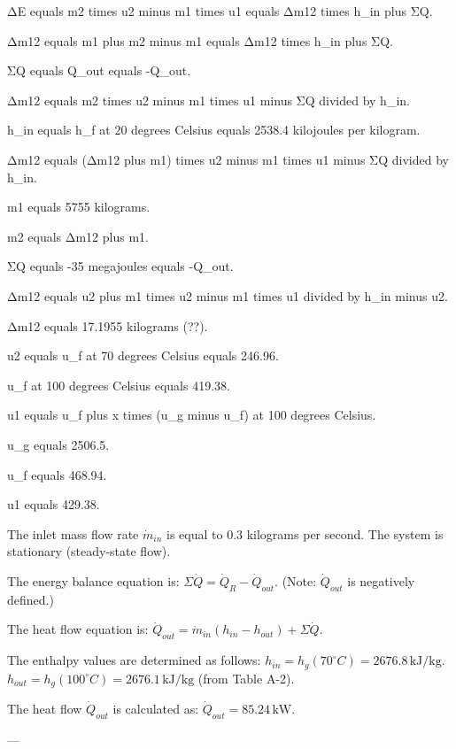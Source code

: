 ΔE equals m2 times u2 minus m1 times u1 equals Δm12 times h_in plus ΣQ.  

Δm12 equals m1 plus m2 minus m1 equals Δm12 times h_in plus ΣQ.  

ΣQ equals Q_out equals -Q_out.  

Δm12 equals m2 times u2 minus m1 times u1 minus ΣQ divided by h_in.  

h_in equals h_f at 20 degrees Celsius equals 2538.4 kilojoules per kilogram.  

Δm12 equals (Δm12 plus m1) times u2 minus m1 times u1 minus ΣQ divided by h_in.  

m1 equals 5755 kilograms.  

m2 equals Δm12 plus m1.  

ΣQ equals -35 megajoules equals -Q_out.  

Δm12 equals u2 plus m1 times u2 minus m1 times u1 divided by h_in minus u2.  

Δm12 equals 17.1955 kilograms (??).  

u2 equals u_f at 70 degrees Celsius equals 246.96.  

u_f at 100 degrees Celsius equals 419.38.  

u1 equals u_f plus x times (u_g minus u_f) at 100 degrees Celsius.  

u_g equals 2506.5.  

u_f equals 468.94.  

u1 equals 429.38.

The inlet mass flow rate \( \dot{m}_{in} \) is equal to 0.3 kilograms per second.  
The system is stationary (steady-state flow).  

The energy balance equation is:  
\( \Sigma \dot{Q} = \dot{Q}_R - \dot{Q}_{out} \).  
(Note: \( \dot{Q}_{out} \) is negatively defined.)  

The heat flow equation is:  
\( \dot{Q}_{out} = \dot{m}_{in} (h_{in} - h_{out}) + \Sigma \dot{Q} \).  

The enthalpy values are determined as follows:  
\( h_{in} = h_g(70^\circ C) = 2676.8 \, \text{kJ/kg} \).  
\( h_{out} = h_g(100^\circ C) = 2676.1 \, \text{kJ/kg} \) (from Table A-2).  

The heat flow \( \dot{Q}_{out} \) is calculated as:  
\( \dot{Q}_{out} = 85.24 \, \text{kW} \).  

---